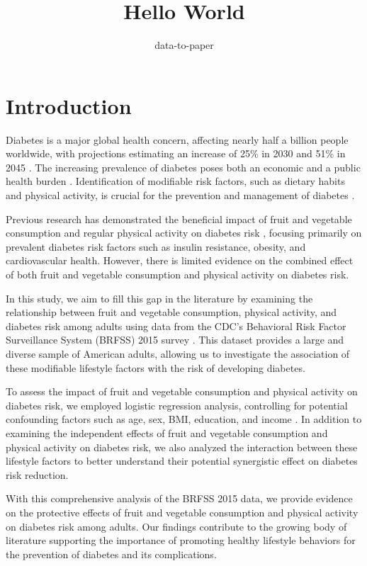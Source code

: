 \documentclass[12pt]{article}
\title{Hello World}
\author{data-to-paper}
\begin{document}
\maketitle

\section{Introduction}

Diabetes is a major global health concern, affecting nearly half a billion people worldwide, with projections estimating an increase of 25\% in 2030 and 51\% in 2045 \cite{Saeedi2019GlobalAR}. The increasing prevalence of diabetes poses both an economic and a public health burden \cite{Wild2004GlobalPO}. Identification of modifiable risk factors, such as dietary habits and physical activity, is crucial for the prevention and management of diabetes \cite{Uloko2018PrevalenceAR}.

Previous research has demonstrated the beneficial impact of fruit and vegetable consumption and regular physical activity on diabetes risk \cite{Li2016AssociationBA, Herbst2007ImpactOP}, focusing primarily on prevalent diabetes risk factors such as insulin resistance, obesity, and cardiovascular health. However, there is limited evidence on the combined effect of both fruit and vegetable consumption and physical activity on diabetes risk.

In this study, we aim to fill this gap in the literature by examining the relationship between fruit and vegetable consumption, physical activity, and diabetes risk among adults using data from the CDC's Behavioral Risk Factor Surveillance System (BRFSS) 2015 survey \cite{Flores-Hernández2015QualityOD,Iachan2016NationalWO}. This dataset provides a large and diverse sample of American adults, allowing us to investigate the association of these modifiable lifestyle factors with the risk of developing diabetes.

To assess the impact of fruit and vegetable consumption and physical activity on diabetes risk, we employed logistic regression analysis, controlling for potential confounding factors such as age, sex, BMI, education, and income \cite{Gomes-Neto2019FruitAV}. In addition to examining the independent effects of fruit and vegetable consumption and physical activity on diabetes risk, we also analyzed the interaction between these lifestyle factors to better understand their potential synergistic effect on diabetes risk reduction.

With this comprehensive analysis of the BRFSS 2015 data, we provide evidence on the protective effects of fruit and vegetable consumption and physical activity on diabetes risk among adults. Our findings contribute to the growing body of literature supporting the importance of promoting healthy lifestyle behaviors for the prevention of diabetes and its complications.
\end{document}
